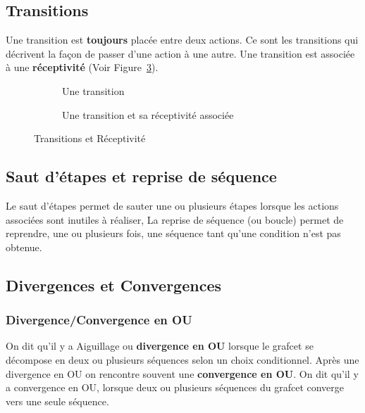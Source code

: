 \subsection{Transitions}

Une transition est \textbf{toujours} placée entre deux actions. Ce sont les transitions qui décrivent la façon de passer d'une action à une autre.
Une transition est associée à une \textbf{réceptivité} (Voir Figure~\ref{fig:transition}).


\begin{figure}[ht]
  \centering
  \begin{subfigure}[b]{.48\textwidth}
    \centering
    \caption{Une transition}
    \label{fig:transition}
  \end{subfigure}
  \begin{subfigure}[b]{.48\textwidth}
    \centering
    \caption{Une transition et sa réceptivité associée}
    \label{fig:transitionEtRecept}
  \end{subfigure}
  \caption{Transitions et Réceptivité}
  \label{fig:transition}
\end{figure}

\subsection{Saut d'étapes et reprise de séquence}
Le saut d'étapes permet de sauter une ou plusieurs étapes lorsque les actions associées sont inutiles à réaliser, La reprise de séquence (ou boucle) permet de reprendre, une ou plusieurs fois, une séquence tant qu'une condition n'est pas obtenue.


\subsection{Divergences et Convergences}
\subsubsection{Divergence/Convergence en OU}
On dit qu'il y a Aiguillage ou \textbf{divergence en OU} lorsque le grafcet se décompose en deux ou plusieurs séquences selon un choix conditionnel. Après une divergence en OU on rencontre souvent une \textbf{convergence en OU}. On dit qu'il y a convergence en OU, lorsque deux ou plusieurs séquences du grafcet converge vers une seule séquence.

